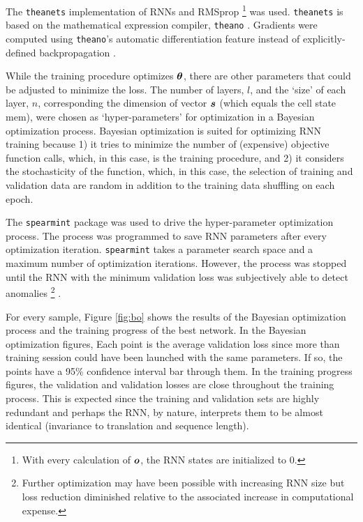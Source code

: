 
The \texttt{theanets} \cite{Johnson2015} implementation of RNNs and RMSprop
\footnote{With every calculation of $\boldsymbol{o}$, the RNN states are initialized to 0.}
was used.
%
\texttt{theanets} is based on the mathematical expression compiler, \texttt{theano} \cite{Bergstra2010}.
%
Gradients were computed using \texttt{theano}'s automatic differentiation feature instead of explicitly-defined backpropagation \cite{Rumelhart1986}.


While the training procedure optimizes $\boldsymbol{\theta}$, there are other parameters that could be adjusted to minimize the loss.
%
The number of layers, $l$, and the `size' of each layer, $n$, corresponding the dimension of vector $\boldsymbol{s}$ (which equals the cell state mem), were chosen as `hyper-parameters' for optimization in a Bayesian optimization process.
%
Bayesian optimization is suited for optimizing RNN training because
1) it tries to minimize the number of (expensive) objective function calls, which, in this case, is the training procedure, and
2) it considers the stochasticity of the function, which, in this case, the selection of training and validation data are random in addition to the training data shuffling on each epoch.


The \texttt{spearmint} \cite{snoek2012practical} package was used to drive the hyper-parameter optimization process.
%
The process was programmed to save RNN parameters after every optimization iteration.
%
\texttt{spearmint} takes a parameter search space and a maximum number of optimization iterations.
%
However, the process was stopped until the RNN with the minimum validation loss was subjectively able to detect anomalies
%
\footnote{
Further optimization may have been possible with increasing RNN size but loss reduction diminished relative to the associated increase in computational expense.
}
.


For every sample, Figure \ref{fig:bo} shows the results of the Bayesian optimization process and the training progress of the best network.
%
In the Bayesian optimization figures, Each point is the average validation loss since more than training session could have been launched with the same parameters.
%
If so, the points have a 95\% confidence interval bar through them.
%
In the training progress figures, the validation and validation losses are close throughout the training process.
%
This is expected since the training and validation sets are highly redundant and perhaps the RNN, by nature, interprets them to be almost identical (invariance to translation and sequence length).



